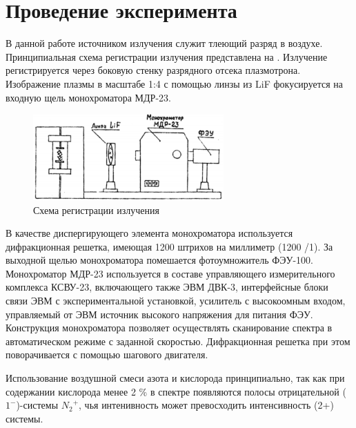 \newpage
\section{Проведение эксперимента}
В данной работе источником излучения служит тлеющий разряд в воздухе.
Принципиальная схема регистрации излучения представлена на . Излучение
регистрируется через боковую стенку разрядного отсека плазмотрона. Изображение плазмы в
масштабе 1:4 с помощью линзы из LiF фокусируется на входную щель монохроматора МДР-23.
\begin{figure}[H]
	\begin{center}
		\includegraphics[width=0.65\textwidth]{ystanovka.png}
		\caption{Схема регистрации излучения}
		\label{ust}
	\end{center}	
\end{figure}

В качестве диспергирующего элемента монохроматора используется дифракционная
решетка, имеющая 1200 штрихов на миллиметр (1200 /1). За выходной щелью
монохроматора помешается фотоумножитель ФЭУ-100. Монохроматор МДР-23
используется в составе управляющего измерительного комплекса КСВУ-23, включающего
также ЭВМ ДВК-3, интерфейсные блоки связи ЭВМ с экспериментальной установкой,
усилитель с высокоомным входом, управляемый от ЭВМ источник высокого напряжения
для питания ФЭУ. Конструкция монохроматора позволяет осуществлять сканирование
спектра в автоматическом режиме с заданной скоростью. Дифракционная решетка при
этом поворачивается с помощью шагового двигателя.


Использование воздушной смеси азота и кислорода принципиально, так как при содержании кислорода менее 2 \% в спектре появляются полосы отрицательной ($1^{-}$)-системы ${N_2}^+$, чья интенивность может превосходить интенсивность (2+) системы.  